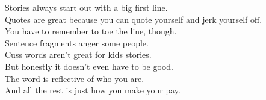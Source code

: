 Stories always start out with a big first line.\\
Quotes are great because you can quote yourself and jerk yourself off.\\
You have to remember to toe the line, though.\\
Sentence fragments anger some people.\\
Cuss words aren't great for kids stories.\\
But honestly it doesn't even have to be good.\\
The word is reflective of who you are.\\
And all the rest is just how you make your pay.\\

